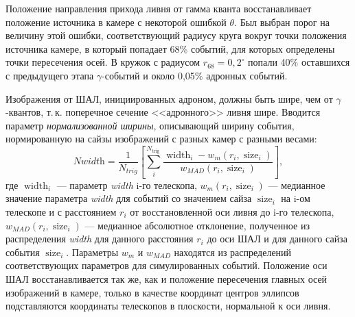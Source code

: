 \documentclass[magd,floatypics,numeref]{msudipl} %
\begin{document}
Положение направления прихода ливня от гамма кванта восстанавливает положение источника в камере с некоторой ошибкой $\theta$. Был выбран порог на величину этой ошибки, соответствующий радиусу круга вокруг точки положения источника камере, в который попадает 68\% событий, для которых определены точки пересечения осей. В кружок с радиусом $r_{68}=0{,}2^{\circ}$ попали 40\% оставшихся с предыдущего этапа $\gamma$-событий и около 0{,}05\% адронных событий.  

Изображения от ШАЛ, инициированных адроном, должны быть шире, чем от $\gamma$-квантов, т.\,к. поперечное сечение <<адронного>> ливня шире. 
Вводится параметр \textit{нормализованной ширины}, описывающий ширину события, нормированную на сайзы изображений с разных камер с разными весами:
\begin{equation}
\textit{Nwidth}=\frac{1}{N_{trig}}\left[\sum_{i}^{N_{\text {trig }}} \frac{\operatorname{width}_{i}-w_{m}\left(r_{i}, \operatorname{size}_{i}\right)}{w_{M A D}\left(r_{i}, \operatorname{size}_{i}\right)}\right],
\end{equation}
где $\operatorname{width}_i$ --- параметр \textit{width} i-го телескопа, $w_{m}\left(r_{i}, \operatorname{size}_{i}\right)$ --- медианное значение параметра \textit{width} для событий со значением сайза $\operatorname{size}_{i}$ на i-ом телескопе и с расстоянием $r_i$ от восстановленной оси ливня до i-го телескопа, $w_{MAD}(r_i, \operatorname{size}_{i})$ --- медианное абсолютное отклонение, полученное из распределения \textit{width} для данного расстояния $r_i$ до оси ШАЛ и для данного сайза события $\operatorname{size}_{i}$. 
Параметры $w_m$ и $w_{MAD}$ находятся из распределений соответствующих параметров для симулированных событий. Положение оси ШАЛ восстанавливается так же, как и положение пересечения главных осей изображений в камере, только в качестве координат центров эллипсов подставляются координаты телескопов в плоскости, нормальной к оси ливня. 
\end{document}

